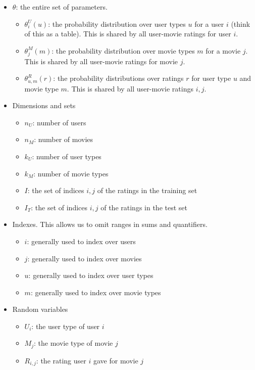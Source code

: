 \documentclass{article}
\begin{document}
\begin{itemize}
\item $\theta$: the entire set of parameters.
  \begin{itemize}
  \item $\theta^U_i(u)$: the probability distribution over user types
    $u$ for a user $i$ (think
    of this as a table). This is shared by all user-movie ratings for
    user $i$.
  \item $\theta^M_j(m)$: the probability distribution over movie
    types $m$ for a movie $j$. This is shared by all user-movie ratings for movie $j$.
  \item $\theta^R_{u,m}(r)$: the probability distributions over
    ratings $r$ for user type $u$ and movie type $m$. This is shared
    by all user-movie ratings $i,j$.
  \end{itemize}
\item Dimensions and sets
  \begin{itemize}
  \item $n_U$: number of users
  \item $n_M$: number of movies
  \item $k_U$: number of user types
  \item $k_M$: number of movie types
  \item $I$: the set of indices $i,j$ of the ratings in the training
    set
  \item $I_T$: the set of indices $i,j$ of the ratings in the test set
  \end{itemize}
\item Indexes. This allows us to omit ranges in sums and quantifiers.
  \begin{itemize}
  \item $i$: generally used to index over users
  \item $j$: generally used to index over movies
  \item $u$: generally used to index over user types
  \item $m$: generally used to index over movie types
  \end{itemize}
\item Random variables
  \begin{itemize}
  \item $U_i$: the user type of user $i$
  \item $M_j$: the movie type of movie $j$
  \item $R_{i,j}$: the rating user $i$ gave for movie $j$
  \end{itemize}
\end{itemize}

\footnotesize


\end{document}
